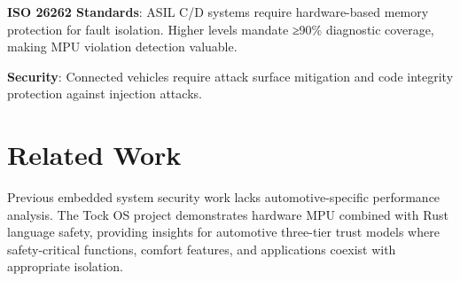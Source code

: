 \textbf{ISO 26262 Standards}: ASIL C/D systems require hardware-based memory protection for fault isolation. Higher levels mandate ≥90\% diagnostic coverage, making MPU violation detection valuable.

\textbf{Security}: Connected vehicles require attack surface mitigation and code integrity protection against injection attacks.

\section{Related Work}

Previous embedded system security work lacks automotive-specific performance analysis. The Tock OS project demonstrates hardware MPU combined with Rust language safety, providing insights for automotive three-tier trust models where safety-critical functions, comfort features, and applications coexist with appropriate isolation.